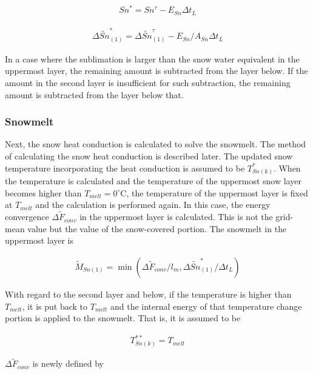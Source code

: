 \begin{eqnarray}
Sn^{\ast} = Sn^{\tau} - E_{Sn} \Delta t_L \label{8-13}
\end{eqnarray}

\begin{eqnarray}
\Delta \widetilde{Sn}_{(1)}^{\ast} = \Delta \widetilde{Sn}_{(1)}^{\tau} - E_{Sn}/A_{Sn} \Delta t_L \label{8-14}
\end{eqnarray}

In a case where the sublimation is larger than the snow water equivalent in the uppermost layer, the remaining amount is subtracted from the layer below. If the amount in the second layer is
insufficient for such subtraction, the remaining amount is subtracted from the layer below that.

\hypertarget{snowmelt}{%
\subsubsection{Snowmelt}\label{snowmelt}}

Next, the snow heat conduction is calculated to solve the snowmelt. The method of calculating the snow heat conduction is described later. The updated snow temperature incorporating the heat
conduction is assumed to be \(T_{Sn(k)}^{\ast}\). When the temperature is calculated and the temperature of the uppermost snow layer becomes higher than \(T_{melt} = 0 ^\circ\mathrm{C}\), the
temperature of the uppermost layer is fixed at \(T_{melt}\) and the calculation is performed again. In this case, the energy convergence \(\Delta \widetilde{F}_{conv}\) in the uppermost layer is
calculated. This is not the grid-mean value but the value of the snow-covered portion. The snowmelt in the uppermost layer is

\begin{eqnarray}
\widetilde{M}_{Sn(1)} = \min(\Delta \widetilde{F}_{conv} / l_m, \Delta \widetilde{Sn}_{(1)}^{\ast}/\Delta t_L ) \label{8-15}
\end{eqnarray}

With regard to the second layer and below, if the temperature is higher than \(T_{melt}\), it is put back to \(T_{melt}\) and the internal energy of that temperature change portion is applied to the
snowmelt. That is, it is assumed to be

\begin{eqnarray}
T_{Sn(k)}^{\ast\ast} = T_{melt} \label{8-16}
\end{eqnarray}

\(\Delta \widetilde{F}_{conv}\) is newly defined by

